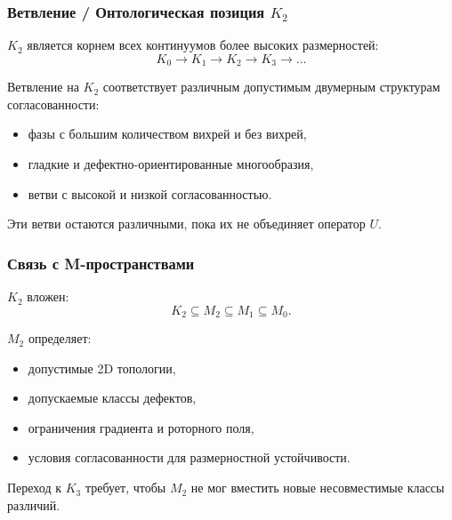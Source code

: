\subsubsection{Ветвление / Онтологическая позиция \texorpdfstring{$K_2$}{K_2}}

$K_2$ является корнем всех континуумов более высоких размерностей:
\[
K_0 \to K_1 \to K_2 \to K_3 \to \dots
\]

Ветвление на $K_2$ соответствует различным допустимым двумерным
структурам согласованности:
\begin{itemize}
    \item фазы с большим количеством вихрей и без вихрей,
    \item гладкие и дефектно-ориентированные многообразия,
    \item ветви с высокой и низкой согласованностью.
\end{itemize}

Эти ветви остаются различными, пока их не объединяет оператор $U$.

\subsubsection{Связь с M-пространствами}

$K_2$ вложен:
\[
K_2 \subseteq M_2 \subseteq M_1 \subseteq M_0.
\]

$M_2$ определяет:
\begin{itemize}
    \item допустимые 2D топологии,
    \item допускаемые классы дефектов,
    \item ограничения градиента и роторного поля,
    \item условия согласованности для размерностной устойчивости.
\end{itemize}

Переход к $K_3$ требует, чтобы $M_2$ не мог вместить новые
несовместимые классы различий.
